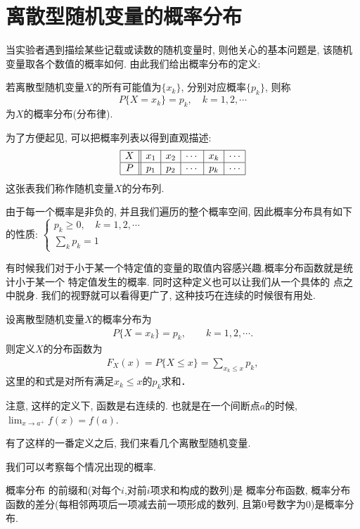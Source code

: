 \section{离散型随机变量的概率分布}
当实验者遇到描绘某些记载或读数的随机变量时, 则他关心的基本问题是, 该随机变量取各个数值的概率如何. 由此我们给出概率分布的定义:
\begin{definition}[概率分布]
    若离散型随机变量$X$的所有可能值为$\{x_k\}$, 分别对应概率$\{p_k\}$, 则称
    $$P\{X=x_k\}=p_k, \quad k=1,2,\cdots$$
    为$X$的概率分布(分布律).
\end{definition}

为了方便起见, 可以把概率列表以得到直观描述:
\[\begin{array}{|c||c|c|c|c|c|}\hline
        X & x_1 & x_2 & \cdots & x_k & \cdots \\ \hline
        P & p_1 & p_2 & \cdots & p_k & \cdots \\ \hline
    \end{array}\]
这张表我们称作随机变量$X$的分布列.

由于每一个概率是非负的, 并且我们遍历的整个概率空间, 因此概率分布具有如下的性质:
$\displaystyle \left\{ \begin{array}{l} p_k\ge 0, \quad k=1,2,\cdots \\
        \sum\limits_{k}{p_k}=1\end{array} \right.$

有时候我们对于小于某一个特定值的变量的取值内容感兴趣.概率分布函数就是统计小于某一个
特定值发生的概率.
同时这种定义也可以让我们从一个具体的
点之中脱身. 我们的视野就可以看得更广了, 这种技巧在连续的时候很有用处.

\begin{definition}[概率分布函数]
    设离散型随机变量$X$的概率分布为
    \begin{align*}
        P\{X=x_k\}=p_k,\qquad k=1,2,\cdots.
    \end{align*}
    则定义$X$的分布函数为
    \begin{align*}
        F_X(x)=P\{X\le x\}=\sum_{x_k\le x} p_k,
    \end{align*}
    这里的和式是对所有满足$x_k\le x$的$p_k$求和．
\end{definition}

注意, 这样的定义下, 函数是右连续的. 也就是在一个间断点$a$的时候, 
$\lim_{x\to a^+}f(x)=f(a)$.

有了这样的一番定义之后, 我们来看几个离散型随机变量.

\begin{takeaway}
    
    我们可以考察每个情况出现的概率. 

    概率分布 的前缀和(对每个$i$,对前$i$项求和构成的数列)是 概率分布函数, 概率分布函数的差分(每相邻两项后一项减去前一项形成的数列, 且第0号数字为0)是概率分布. 
\end{takeaway}


